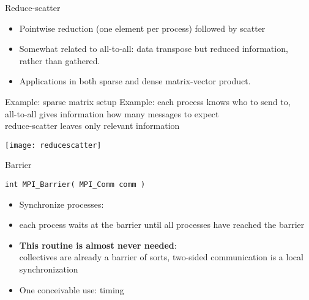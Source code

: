 \begin{numberedframe}{Reduce-scatter}
  \begin{itemize}
  \item 
    Pointwise reduction (one element per process) followed by scatter
  \item 
    Somewhat related to all-to-all: data transpose but reduced
    information, rather than gathered.
  \item Applications in both sparse and dense matrix-vector product.
  \end{itemize}
\end{numberedframe}

\begin{numberedframe}{Example: sparse matrix setup}
  Example: each process knows who to send to, \\
  all-to-all gives information how many messages to expect\\
  reduce-scatter leaves only relevant information

  \texttt{[image: reducescatter]}
\end{numberedframe}

\begin{numberedframe}{Barrier}
\begin{lstlisting}
int MPI_Barrier( MPI_Comm comm )
\end{lstlisting}
  \begin{itemize}
  \item Synchronize processes:
  \item each process waits at the barrier until all processes have reached the barrier
  \item \textbf{This routine is almost never needed}:\\
    collectives are already a barrier of sorts, two-sided
    communication is a local synchronization
  \item One conceivable use: timing
  \end{itemize}
\end{numberedframe}


